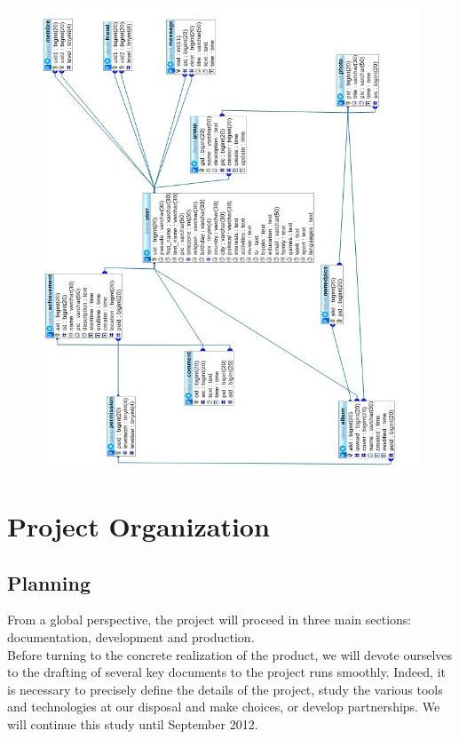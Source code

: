 \documentclass{life-fr}
\begin{document}
\begin{figure}[H]
  \begin{center}
    \includegraphics[width=18cm]{img/imgdb.jpg}
  \end{center}
\end{figure}

\chapter{Project Organization}

\section{Planning}

From a global perspective, the project will proceed in three main sections: documentation, development and production.\\

Before turning to the concrete realization of the product, we will devote ourselves to the drafting of several key documents to the project runs smoothly. Indeed, it is necessary to precisely define the details of the project, study the various tools and technologies at our disposal and make choices, or develop partnerships. We will continue this study until September 2012.\\
\end{document}
